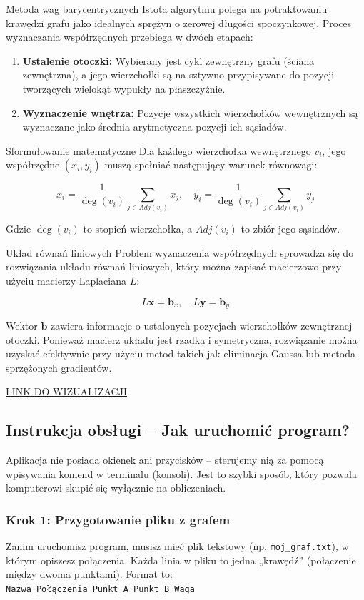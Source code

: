 \documentclass[12pt,a4paper]{article}
\begin{document}
Metoda wag barycentrycznych
Istota algorytmu polega na potraktowaniu krawędzi grafu jako idealnych sprężyn o zerowej długości spoczynkowej. Proces wyznaczania współrzędnych przebiega w dwóch etapach:

\begin{enumerate}
    \item \textbf{Ustalenie otoczki:} Wybierany jest cykl zewnętrzny grafu (ściana zewnętrzna), a jego wierzchołki są na sztywno przypisywane do pozycji tworzących wielokąt wypukły na płaszczyźnie.
    \item \textbf{Wyznaczenie wnętrza:} Pozycje wszystkich wierzchołków wewnętrznych są wyznaczane jako średnia arytmetyczna pozycji ich sąsiadów.
\end{enumerate}

Sformułowanie matematyczne
Dla każdego wierzchołka wewnętrznego $v_i$, jego współrzędne $(x_i, y_i)$ muszą spełniać następujący warunek równowagi:

$$x_i = \frac{1}{\deg(v_i)} \sum_{j \in Adj(v_i)} x_j, \quad y_i = \frac{1}{\deg(v_i)} \sum_{j \in Adj(v_i)} y_j$$

Gdzie $\deg(v_i)$ to stopień wierzchołka, a $Adj(v_i)$ to zbiór jego sąsiadów. 

Układ równań liniowych
Problem wyznaczenia współrzędnych sprowadza się do rozwiązania układu równań liniowych, który można zapisać macierzowo przy użyciu macierzy Laplaciana $L$:

$$L\mathbf{x} = \mathbf{b}_x, \quad L\mathbf{y} = \mathbf{b}_y$$

Wektor $\mathbf{b}$ zawiera informacje o ustalonych pozycjach wierzchołków zewnętrznej otoczki. Ponieważ macierz układu jest rzadka i symetryczna, rozwiązanie można uzyskać efektywnie przy użyciu metod takich jak eliminacja Gaussa lub metoda sprzężonych gradientów.

\href{https://www.youtube.com/shorts/ZZ8RrJtKJ-o}{LINK DO WIZUALIZACJI}
\subsection{Instrukcja obsługi – Jak uruchomić program?}

Aplikacja nie posiada okienek ani przycisków – sterujemy nią za pomocą wpisywania komend w terminalu (konsoli). Jest to szybki sposób, który pozwala komputerowi skupić się wyłącznie na obliczeniach.

\subsubsection{Krok 1: Przygotowanie pliku z grafem}
Zanim uruchomisz program, musisz mieć plik tekstowy (np. \texttt{moj\_graf.txt}), w którym opiszesz połączenia. Każda linia w pliku to jedna „krawędź” (połączenie między dwoma punktami). Format to: 
\\ \texttt{Nazwa\_Połączenia Punkt\_A Punkt\_B Waga}
\end{document}
